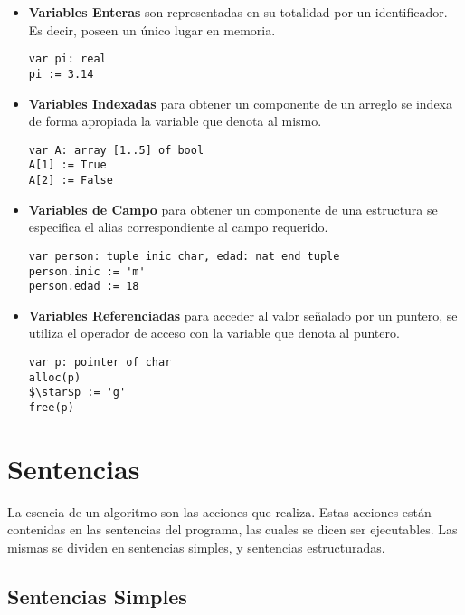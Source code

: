 \documentclass{article}
\begin{document}
\begin{itemize}
\item \textbf{Variables Enteras} son representadas en su totalidad por un identificador. Es decir, poseen un único lugar en memoria.

\begin{lstlisting}
var pi: real
pi := 3.14
\end{lstlisting}

\item \textbf{Variables Indexadas} para obtener un componente de un arreglo se indexa de forma apropiada la variable que denota al mismo.

\begin{lstlisting}
var A: array [1..5] of bool
A[1] := True
A[2] := False
\end{lstlisting}

\item \textbf{Variables de Campo} para obtener un componente de una estructura se especifica el alias correspondiente al campo requerido.

\begin{lstlisting}
var person: tuple inic char, edad: nat end tuple
person.inic := 'm'
person.edad := 18
\end{lstlisting}

\item \textbf{Variables Referenciadas} para acceder al valor señalado por un puntero, se utiliza el operador de acceso con la variable que denota al puntero.

\begin{lstlisting}
var p: pointer of char
alloc(p)
$\star$p := 'g'
free(p)
\end{lstlisting}

\end{itemize}

\section{Sentencias}

La esencia de un algoritmo son las acciones que realiza.
Estas acciones están contenidas en las sentencias del programa, las cuales se dicen ser ejecutables.
Las mismas se dividen en sentencias simples, y sentencias estructuradas.

\subsection{Sentencias Simples}
\end{document}
